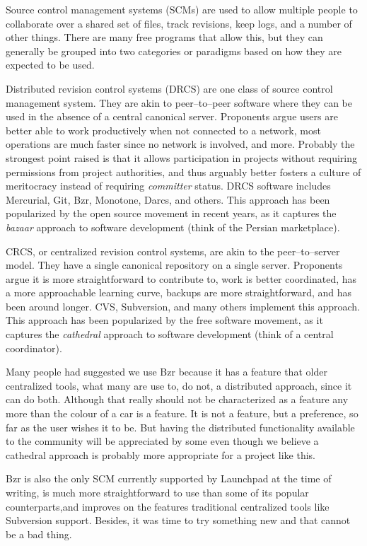 
Source control management systems (SCMs) are used to allow multiple people to collaborate over a shared set of files, track revisions, keep logs, and a number of other things. There are many free programs that allow this, but they can generally be grouped into two categories or paradigms based on how they are expected to be used. 

Distributed revision control systems (DRCS) are one class of source control management system. They are akin to peer--to--peer software where they can be used in the absence of a central canonical server. Proponents argue users are better able to work productively when not connected to a network, most operations are much faster since no network is involved, and more. Probably the strongest point raised is that it allows participation in projects without requiring permissions from project authorities, and thus arguably better fosters a culture of meritocracy instead of requiring {\it committer} status. DRCS software includes Mercurial, Git, Bzr, Monotone, Darcs, and others. This approach has been popularized by the open source movement in recent years, as it captures the {\it bazaar} approach to software development (think of the Persian marketplace).

CRCS, or centralized revision control systems, are akin to the peer--to--server model. They have a single canonical repository on a single server. Proponents argue it is more straightforward to contribute to, work is better coordinated, has a more approachable learning curve, backups are more straightforward, and has been around longer. CVS, Subversion, and many others implement this approach. This approach has been popularized by the free software movement, as it captures the {\it cathedral} approach to software development (think of a central coordinator).

Many people had suggested we use Bzr because it has a feature that older centralized tools, what many are use to, do not, a distributed approach, since it can do both. Although that really should not be characterized as a feature any more than the colour of a car is a feature. It is not a feature, but a preference, so far as the user wishes it to be. But having the distributed functionality available to the community will be appreciated by some even though we believe a cathedral approach is probably more appropriate for a project like this. 

Bzr is also the only SCM currently supported by Launchpad at the time of writing, is much more straightforward to use than some of its popular counterparts, and improves on the features traditional centralized tools like Subversion support. Besides, it was time to try something new and that cannot be a bad thing.

